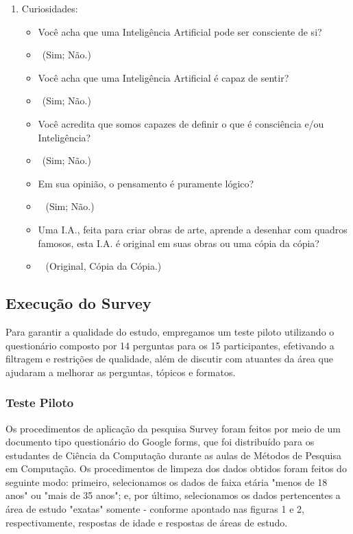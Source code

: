 \documentclass[onecolumn,12pt]{asme2ej}
\begin{document}
\begin{enumerate}
   \item Curiosidades:
   \begin{itemize}
     \item[$*$] Você acha que uma Inteligência Artificial pode ser consciente de si?
     \item[$-$]$\ \ $(Sim; Não.)
     \item[$*$] Você acha que uma Inteligência Artificial é capaz de sentir?
     \item[$-$]$\ \ $(Sim; Não.)
     \item[$*$] Você acredita que somos capazes de definir o que é consciência e/ou Inteligência?
     \item[$-$]$\ \ $(Sim; Não.)
     \item[$*$] Em sua opinião, o pensamento é puramente lógico?
     \item[$-$]$\ \ $ (Sim; Não.)
     \item[$*$] Uma I.A., feita para criar obras de arte, aprende a desenhar com quadros famosos, esta I.A. é original em suas obras ou uma cópia da cópia?
     \item[$-$]$\ \ $ (Original, Cópia da Cópia.)
   \end{itemize}

\end{enumerate}

\subsection{Execução do Survey} 

Para garantir a qualidade do estudo, empregamos um teste piloto utilizando o questionário composto por 14 perguntas para os 15 participantes, efetivando a filtragem e restrições de qualidade, além de discutir com atuantes da área que ajudaram a melhorar as perguntas, tópicos e formatos.

\subsubsection{Teste Piloto} 

Os procedimentos de aplicação da pesquisa Survey\cite{survey_8} foram feitos por meio de um documento tipo questionário do Google forms, que foi distribuído para os estudantes de Ciência da Computação durante as aulas de Métodos de Pesquisa em Computação. Os procedimentos de limpeza dos dados obtidos foram feitos do seguinte modo: primeiro, selecionamos os dados de faixa etária "menos de 18 anos" ou "mais de 35 anos"; e, por último, selecionamos os dados pertencentes a área de estudo "exatas" somente - conforme apontado nas figuras 1 e 2, respectivamente, respostas de idade e respostas de áreas de estudo.
\end{document}
